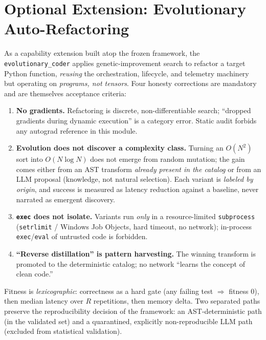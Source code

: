 \documentclass[11pt]{article}
\begin{document}
\section{Optional Extension: Evolutionary Auto-Refactoring}
\label{sec:evo}
As a capability extension built atop the frozen framework, the
\texttt{evolutionary\_coder} applies genetic-improvement search
\cite{koza1992gp,petke2018gi,legoues2012genprog} to refactor a target Python
function, \emph{reusing} the orchestration, lifecycle, and telemetry machinery
but operating on \emph{programs, not tensors}. Four honesty corrections are
mandatory and are themselves acceptance criteria:
\begin{enumerate}[leftmargin=1.4em,itemsep=2pt]
\item \textbf{No gradients.} Refactoring is discrete, non-differentiable search;
``dropped gradients during dynamic execution'' is a category error. Static audit
forbids any autograd reference in this module.
\item \textbf{Evolution does not discover a complexity class.} Turning an
$O(N^2)$ sort into $O(N\log N)$ does not emerge from random mutation; the gain
comes either from an AST transform \emph{already present in the catalog} or from
an LLM proposal (knowledge, not natural selection). Each variant is
\emph{labeled by origin}, and success is measured as latency reduction against a
baseline, never narrated as emergent discovery.
\item \textbf{\texttt{exec} does not isolate.} Variants run \emph{only} in a
resource-limited \texttt{subprocess} (\texttt{setrlimit} / Windows Job Objects,
hard timeout, no network); in-process \texttt{exec}/\texttt{eval} of untrusted
code is forbidden.
\item \textbf{``Reverse distillation'' is pattern harvesting.} The winning
transform is promoted to the deterministic catalog; no network ``learns the
concept of clean code.''
\end{enumerate}
Fitness is \emph{lexicographic}: correctness as a hard gate (any failing test
$\Rightarrow$ fitness $0$), then median latency over $R$ repetitions, then memory
delta. Two separated paths preserve the reproducibility decision of the
framework: an AST-deterministic path (in the validated set) and a
quarantined, explicitly non-reproducible LLM path (excluded from statistical
validation).

\end{document}
